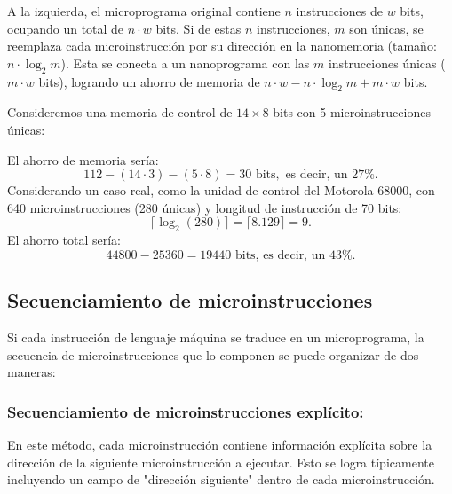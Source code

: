 A la izquierda, el microprograma original contiene $n$ instrucciones de $w$ bits, ocupando un total de $n \cdot w$ bits. Si de estas $n$ instrucciones, $m$ son únicas, se reemplaza cada microinstrucción por su dirección en la nanomemoria (tamaño: $n \cdot \log_2 m$). Esta se conecta a un nanoprograma con las $m$ instrucciones únicas ($m \cdot w$ bits), logrando un ahorro de memoria de $n \cdot w - n \cdot \log_2 m + m \cdot w$ bits.

\begin{ejemplo}
    Consideremos una memoria de control de $14 \times 8$ bits con 5 microinstrucciones únicas:
    \begin{center}
        
    \end{center}
    El ahorro de memoria sería:
    \[
    112 - (14 \cdot 3) - (5 \cdot 8) = 30 \text{ bits}, \text{ es decir, un } 27\%.
    \]
    Considerando un caso real, como la unidad de control del Motorola 68000, con 640 microinstrucciones (280 únicas) y longitud de instrucción de 70 bits:
    \[
    \lceil\log_2(280)\rceil = \lceil 8.129\rceil = 9.
    \]
    El ahorro total sería:
    \[
    44800 - 25360 = 19440 \text{ bits, es decir, un } 43\%.
    \]
\end{ejemplo}

\subsection{Secuenciamiento de microinstrucciones}
Si cada instrucción de lenguaje máquina se traduce en un microprograma, la secuencia de microinstrucciones que lo componen se puede organizar de dos maneras:
\subsubsection*{Secuenciamiento de microinstrucciones explícito:}

En este método, cada microinstrucción contiene información explícita sobre la dirección de la siguiente microinstrucción a ejecutar. Esto se logra típicamente incluyendo un campo de "dirección siguiente" dentro de cada microinstrucción.


